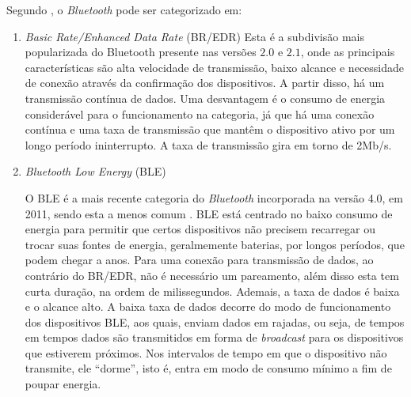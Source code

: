 Segundo , o \textit{Bluetooth} pode ser categorizado em:

\begin{enumerate}[label=(\Alph*)]
    
    \item \textit{Basic Rate/Enhanced Data Rate} (BR/EDR)
    Esta é a subdivisão mais popularizada do Bluetooth presente nas versões $2.0$ e $2.1$, onde as principais características são alta velocidade de transmissão, baixo alcance e necessidade de conexão através da confirmação dos dispositivos. A partir disso, há um transmissão contínua de dados. Uma desvantagem é o consumo de energia considerável para o funcionamento na categoria, já que há uma conexão contínua e uma taxa de transmissão que mantêm o dispositivo ativo por um longo período ininterrupto.
    A taxa de transmissão gira em torno de 2Mb/s.
     
    
    \item \textit{Bluetooth Low Energy} (BLE)
    
    O BLE é a mais recente categoria do \textit{Bluetooth} incorporada na versão 4.0, em 2011, sendo esta a menos comum \cite{LinkLabs2015}.
    BLE está centrado no baixo consumo de energia para permitir que certos dispositivos não precisem recarregar ou trocar suas fontes de energia, geralmemente baterias, por longos períodos, que podem chegar a anos. 
    Para uma conexão para transmissão de dados, ao contrário do BR/EDR, não é necessário um pareamento, além disso esta tem curta duração, na ordem de milissegundos.
    Ademais, a taxa de dados é baixa e o alcance alto. A baixa taxa de dados decorre do modo de funcionamento dos dispositivos BLE, aos quais, enviam dados em rajadas, ou seja, de tempos em tempos dados são transmitidos em forma de \textit{broadcast} para os dispositivos que estiverem próximos. Nos intervalos de tempo em que o dispositivo não transmite, ele ``dorme'', isto é, entra em modo de consumo mínimo a fim de poupar energia.
    

\end{enumerate}
